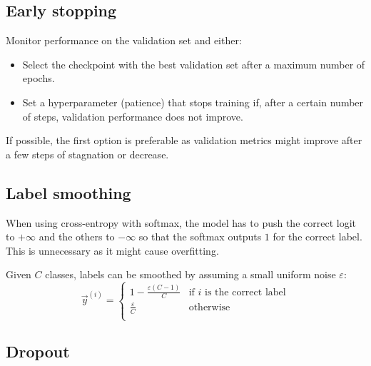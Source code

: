 \subsection{Early stopping}

Monitor performance on the validation set and either:
\begin{itemize}
    \item Select the checkpoint with the best validation set after a maximum number of epochs.
    \item Set a hyperparameter (patience) that stops training if, after a certain number of steps, validation performance does not improve.
\end{itemize}

\begin{remark}
    If possible, the first option is preferable as validation metrics might improve after a few steps of stagnation or decrease.
\end{remark}


\subsection{Label smoothing}

When using cross-entropy with softmax, the model has to push the correct logit to $+\infty$ and the others to $-\infty$ so that the softmax outputs $1$ for the correct label. This is unnecessary as it might cause overfitting.

Given $C$ classes, labels can be smoothed by assuming a small uniform noise $\varepsilon$:
\[
    \vec{y}^{(i)} = \begin{cases}
        1 - \frac{\varepsilon(C-1)}{C} & \text{if $i$ is the correct label} \\
        \frac{\varepsilon}{C} & \text{otherwise} \\
    \end{cases}
\]


\subsection{Dropout}


